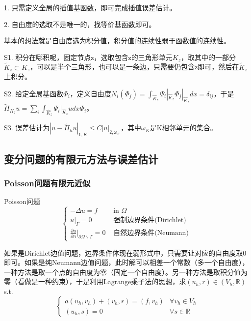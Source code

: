 1. 只需定义全局的插值基函数，即可完成插值误差估计。

2. 自由度的选取不是唯一的，找等价基函数即可。

基本的想法就是自由度选为积分值，积分值的连续性弱于函数值的连续性。

S1. 积分在哪积呢，固定节点z，选取包含z的三角形单元$K_z$，取其中的一部分$\widetilde{K}_z \subset K_z$，可以是半个三角形，也可以是一条边，只需要仍包含z即可，然后在$\widetilde{K}_z$上积分。

S2. 给定全局基函数$\Phi_i$，定义自由度$N_i(\Phi_j) = \int_{\widehat{K}_z} \Psi_i|_{\widehat{K}_z} \Phi_j|_{\widehat{K}_z} dx = \delta_{ij}$，于是$\widetilde{\Pi}_{K_z} u = \sum_i \int_{\widehat{K}_z} \Psi_i|_{\widehat{K}_z} u dx \Phi_i$。

S3. 误差估计为$|u-\widetilde{\Pi}_{h} u|_{1, K} \leq C|u|_{2, \omega_{K}}$，其中$\omega_{K}$是K相邻单元的集合。

\subsection{变分问题的有限元方法与误差估计}

\subsubsection{Poisson问题有限元近似}

Poisson问题
\[
  \left\{\begin{array}{ll}
    -\Delta u=f & \text{ in } \Omega\\
    u|_{\Gamma}=0 & \text{ 强制边界条件(Dirichlet) } \\
    \frac{\partial u}{\partial n}|_{\partial \Omega \backslash \Gamma}=0 & \text{ 自然边界条件(Neumann) }
  \end{array}\right.
\]

如果是Dirichlet边值问题，边界条件体现在弱形式中，只需要让对应的自由度取0即可。如果是纯Neumann边值问题，此时解可以相差一个常数（多一个自由度），一种方法是取一个点的自由度为零（固定一个自由度）。另一种方法是取积分值为零（看做是一种约束），于是利用Lagrange乘子法的思想，求$\left(u_{h}, r\right) \in\left(V_{h}, \mathbb{R}\right)$ s.t.
\[
  \left\{\begin{array}{ll}
  a\left(u_{h}, v_{h}\right)+\left(v_{h}, r\right)=\left(f, v_{h}\right) & \forall v_{h} \in V_{h} \\
  \left(u_{h}, s\right)=0 & \forall s \in \mathbb{R}
  \end{array}\right.
\]

